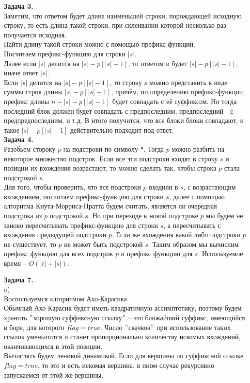 \documentclass[12pt,a4paper]{scrartcl}
\begin{document}
	\textbf{Задача 3.} \\
		
		Заметим, что ответом будет длина наименьшей строки, порождающей исходную строку, то есть длина такой строки, при склеивании которой несколько раз получается исходная. \\
		Найти длину такой строки можно с помощью префикс-функции.\\
		Посчитаем префикс-функцию для строки $|s|$.\\
		Далее если $|s|$ делится на $|s| - p[|s| - 1]$, то ответом и будет $|s| - p[|s| - 1]$, иначе ответ $|s|$.\\
		Если $|s|$ делится на $|s| - p[|s| - 1]$, то строку $s$ можно представить в виде суммы строк длины $|s| - p[|s| - 1]$, причём, по определению префикс-функции, префикс длины $n - |s| - p[|s| - 1]$ будет совпадать с её суффиксом. Но тогда последний блок должен будет совпадать с предпоследним, предпоследний - с предпредпоследним, и т.д. В итоге получится, что все блоки блоки совпадают, и такое $|s| - p[|s| - 1]$ действительно подходит под ответ. \\
	
	\textbf{Задача 4.} \\
	
	Разобьем стороку $p$ на подстроки по символу *. Тогда $p$ можно разбить на некоторое множество подстрок. Если все эти подстроки входят в строку $s$ и позиции их вхождения возрастают, то можно сделать так, чтобы строка $p$ стала подстрокой $s$.\\
	Для того, чтобы проверить, что все подстроки $p$ входили в $s$, с возрастающим вхождением, посчитаем префикс-функцию для строки $s$, далее с помощью алгоритма Кнута-Морриса-Пратта будем считать, является ли очередная подстрока из $p$ подстрокой $s$. Но при переходе к новой подстроке $p$ мы будем не заново пересчитывать префикс-функцию для строки $s$, а пересчитывать с вхождения предыдущей подстроки $p$. Если же вхождения какой либо подстроки $p$ не существует, то $p$ не может быть подстрокой $s$. Таким образом мы вычислим префикс функцию для всех подстрок $p$ и префикс функцию для $s$. Используемое время -- $O(|t| + |s|)$.
	
	\textbf{Задача 7.} \\
	
	a) \\
		Воспользуемся алгоритмом Ахо-Карасика \\
		Обычный Ахо-Карасик будет иметь квадратичную ассимптотику, поэтому будем хранить $"$хорошую суффиксную ссылку$"$ -- это ближайший суффикс, имеющийся в боре, для которого $flag=true$. Число $"$скачков$"$ при использование таких ссылок уменьшится и станет пропорционально количеству искомых вхождений, оканчивающихся в этой позиции. \\
		Вычислять будем ленивой динамикой. Если для вершины по суффиксной ссылке $flag=true$, то это и есть искомая вершина, в ином случае рекурсивно запускаемся от этой же вершины. \\
	
\end{document}
